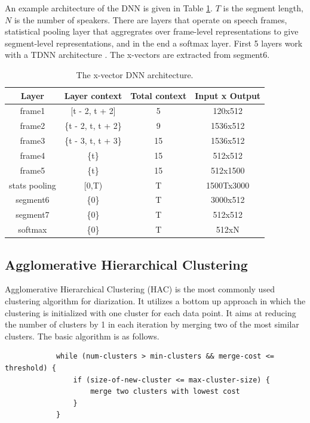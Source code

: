 		An example architecture of the DNN is given in Table \ref{table-xvec-dnn}. $T$ is the segment length, $N$ is the number of speakers. There are layers that operate on speech frames, statistical pooling layer that aggregrates over frame-level representations to give segment-level representations, and in the end a softmax layer. First 5 layers work with a TDNN architecture \cite{peddinti2015time}. The x-vectors are extracted from segment6.
		
		\begin{table}[h]
			\centering
			\begin{tabular}{|c|c|c|c|}
				\hline
				Layer & Layer context & Total context & Input x Output \\
				\hline
				frame1 & [t - 2, t + 2] & 5 & 120x512 \\
				frame2 & \{t - 2, t, t + 2\} & 9 & 1536x512 \\
				frame3 & \{t - 3, t, t + 3\} & 15 & 1536x512 \\
				frame4 & \{t\} & 15 & 512x512 \\
				frame5 & \{t\} & 15 & 512x1500 \\
				stats pooling & [0,T) & T & 1500Tx3000 \\
				segment6 & \{0\} & T & 3000x512 \\
				segment7 & \{0\} & T & 512x512 \\
				softmax & \{0\} & T & 512xN \\
				\hline
			\end{tabular}
			\caption{The x-vector DNN architecture.}
			\label{table-xvec-dnn}
		\end{table}
		
	\subsection{Agglomerative Hierarchical Clustering}
		Agglomerative Hierarchical Clustering (HAC) is the most commonly used clustering algorithm for diarization. It utilizes a bottom up approach in which the clustering is initialized with one cluster for each data point. It aims at reducing the number of clusters by 1 in each iteration by merging two of the most similar clusters. The basic algorithm is as follows.
		
		\begin{verbatim}
			while (num-clusters > min-clusters && merge-cost <= threshold) {
			    if (size-of-new-cluster <= max-cluster-size) {
			        merge two clusters with lowest cost
			    }
			}
		\end{verbatim}


